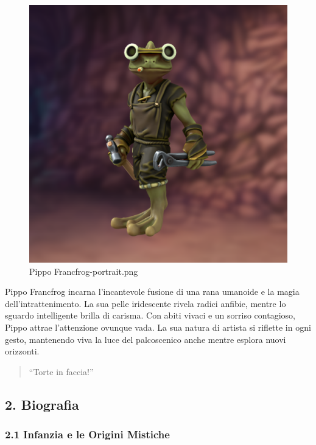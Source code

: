 \begin{figure}
\centering
\includegraphics{Pippo_Francfrog-portrait.png}
\caption{Pippo Francfrog-portrait.png}
\end{figure}

Pippo Francfrog incarna l'incantevole fusione di una rana umanoide e la
magia dell'intrattenimento. La sua pelle iridescente rivela radici
anfibie, mentre lo sguardo intelligente brilla di carisma. Con abiti
vivaci e un sorriso contagioso, Pippo attrae l'attenzione ovunque vada.
La sua natura di artista si riflette in ogni gesto, mantenendo viva la
luce del palcoscenico anche mentre esplora nuovi orizzonti.

\begin{quote}
``Torte in faccia!''
\end{quote}

\subsection{2. Biografia}\label{biografia}


\subsubsection{2.1 Infanzia e le Origini
Mistiche}\label{infanzia-e-le-origini-mistiche}

